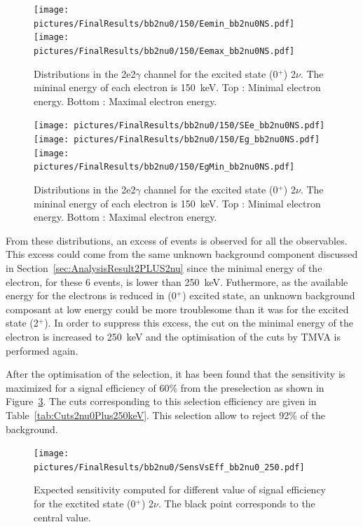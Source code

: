 \documentclass[main.tex]{subfiles}
\begin{document}
\begin{figure} [h!]
\begin{center}
\texttt{[image: pictures/FinalResults/bb2nu0/150/Eemin\_bb2nu0NS.pdf]}
\texttt{[image: pictures/FinalResults/bb2nu0/150/Eemax\_bb2nu0NS.pdf]}
\end{center}
\caption{Distributions in the 2e2$\gamma$ channel for the excited state (0$^+$) 2$\nu$. The mininal energy of each electron is 150~keV. Top : Minimal electron energy. Bottom : Maximal electron energy.}
\label{plot:EeminAndEemax250bb2nu0_150}
\end{figure}


\begin{figure} [h!]
\begin{center}
\texttt{[image: pictures/FinalResults/bb2nu0/150/SEe\_bb2nu0NS.pdf]}
\texttt{[image: pictures/FinalResults/bb2nu0/150/Eg\_bb2nu0NS.pdf]}
\texttt{[image: pictures/FinalResults/bb2nu0/150/EgMin\_bb2nu0NS.pdf]}
\end{center}
\caption{Distributions in the 2e2$\gamma$ channel for the excited state (0$^+$) 2$\nu$. The mininal energy of each electron is 150~keV. Top : Minimal electron energy. Bottom : Maximal electron energy.}
\label{plot:SEeAndEg250bb2nu0_150}
\end{figure}


\NI From these distributions, an excess of events is observed for all the observables. This excess could come from the same unknown background component discussed in Section~\ref{sec:AnalysisResult2PLUS2nu} since the minimal energy of the electron, for these 6 events, is lower than 250~keV. Futhermore, as the available energy for the electrons is reduced in (0$^+$) excited state, an unknown background composant at low energy could be more troublesome than it was for the excited state (2$^+$). In order to suppress this excess, the cut on the minimal energy of the electron is increased to 250~keV and the optimisation of the cuts by TMVA is performed again.


\bigskip


\NI After the optimisation of the selection, it has been found that the sensitivity is maximized for a signal efficiency of 60\% from the preselection as shown in Figure~\ref{plot:SensVsEffbb2nu0_250}. The cuts corresponding to this selection efficiency are given in Table~\ref{tab:Cuts2nu0Plus250keV}. This selection allow to reject 92\% of the background.


\begin{figure} [h!]
\begin{center}
\texttt{[image: pictures/FinalResults/bb2nu0/SensVsEff\_bb2nu0\_250.pdf]}
\end{center}
\caption{Expected sensitivity computed for different value of signal efficiency for the exctited state (0$^+$) 2$\nu$. The black point corresponds to the central value.}
\label{plot:SensVsEffbb2nu0_250}
\end{figure}
\end{document}
